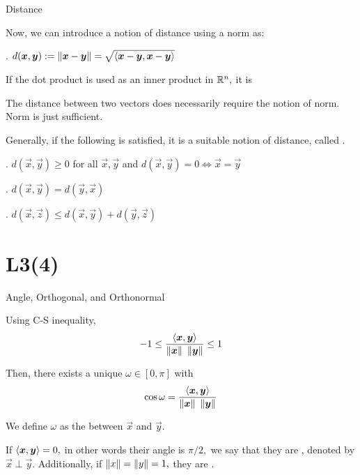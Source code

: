 \documentclass[handout,fleqn,aspectratio=169]{beamer}
\begin{document}
\begin{frame}{Distance}

\plitemsep 0.1in

\bci 

\item Now, we can introduce a notion of distance using a norm as:

\medskip
{}. $d(\bm{x},\bm{y}) := \left \lVert \bm{x} - \bm{y} \right \rVert = \sqrt{\left\langle \bm{x}-\bm{y}, \bm{x}-\bm{y} \right\rangle} $

\item If the dot product is used as an inner product in ${\mathbb R}^n,$ it is 

\item {} The distance between two vectors does  necessarily require the notion of norm. Norm is just sufficient. 

\item Generally, if the following is satisfied, it is a suitable notion of distance, called . 
\bci
\item {}. $d(\vec{x},\vec{y}) \ge 0$ for all $\vec{x},\vec{y}$ and $d(\vec{x},\vec{y}) = 0 \Longleftrightarrow \vec{x}=\vec{y}$ 
\item {}. $d(\vec{x},\vec{y}) = d(\vec{y},\vec{x})$
\item {}. $d(\vec{x},\vec{z}) \le d(\vec{x},\vec{y}) + d(\vec{y},\vec{z})$
\eci
\eci
\end{frame}

\section{L3(4)}
\begin{frame}{Angle,  Orthogonal, and Orthonormal}

\plitemsep 0.1in

\bci 

\item Using C-S inequality, $$-1 \le \frac{\left\langle \bm{x}, \bm{y} \right\rangle}{\left \lVert \bm{x} \right \rVert \ \left \lVert \bm{y} \right \rVert} \le 1$$

\item Then, there exists a unique $\omega \in [0,\pi]$ with $$\cos \omega = \frac{\inner{\vec{x}}{\vec{y}}}{\norm{\vec{x}} \ \norm{\vec{y}}}$$

\item We define $\omega$ as the  between $\vec{x}$ and $\vec{y}.$

\item {} If $\left\langle \bm{x}, \bm{y} \right\rangle = 0,$ in other words their angle is $\pi/2,$ we say that they are , denoted by $\vec{x} \perp \vec{y}.$ Additionally, if $\left \lVert x \right \rVert = \left \lVert y \right \rVert =1,$ they are .
\eci
\end{frame}
\end{document}
